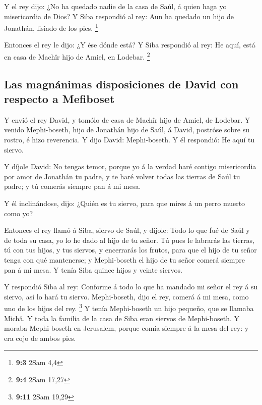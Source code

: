  Y el rey dijo: ¿No ha quedado nadie de la casa de Saúl, á
quien haga yo misericordia de Dios? Y Siba respondió al rey: Aun ha
quedado un hijo de Jonathán, lisiado de los pies. \footnote{\textbf{9:3}
  2Sam 4,4}

 Entonces el rey le dijo: ¿Y ése dónde está? Y Siba
respondió al rey: He aquí, está en casa de Machîr hijo de Amiel, en
Lodebar. \footnote{\textbf{9:4} 2Sam 17,27}

\hypertarget{las-magnuxe1nimas-disposiciones-de-david-con-respecto-a-mefiboset}{%
\subsection{Las magnánimas disposiciones de David con respecto a
Mefiboset}\label{las-magnuxe1nimas-disposiciones-de-david-con-respecto-a-mefiboset}}

 Y envió el rey David, y tomólo de casa de Machîr hijo de
Amiel, de Lodebar.  Y venido Mephi-boseth, hijo de
Jonathán hijo de Saúl, á David, postróse sobre su rostro, é hizo
reverencia. Y dijo David: Mephi-boseth. Y él respondió: He aquí tu
siervo.

 Y díjole David: No tengas temor, porque yo á la verdad
haré contigo misericordia por amor de Jonathán tu padre, y te haré
volver todas las tierras de Saúl tu padre; y tú comerás siempre pan á mi
mesa.

 Y él inclinándose, dijo: ¿Quién es tu siervo, para que
mires á un perro muerto como yo?

 Entonces el rey llamó á Siba, siervo de Saúl, y díjole:
Todo lo que fué de Saúl y de toda su casa, yo lo he dado al hijo de tu
señor.  Tú pues le labrarás las tierras, tú con tus
hijos, y tus siervos, y encerrarás los frutos, para que el hijo de tu
señor tenga con qué mantenerse; y Mephi-boseth el hijo de tu señor
comerá siempre pan á mi mesa. Y tenía Siba quince hijos y veinte
siervos.

 Y respondió Siba al rey: Conforme á todo lo que ha
mandado mi señor el rey á su siervo, así lo hará tu siervo.
Mephi-boseth, dijo el rey, comerá á mi mesa, como uno de los hijos del
rey. \footnote{\textbf{9:11} 2Sam 19,29}  Y tenía
Mephi-boseth un hijo pequeño, que se llamaba Michâ. Y toda la familia de
la casa de Siba eran siervos de Mephi-boseth.  Y moraba
Mephi-boseth en Jerusalem, porque comía siempre á la mesa del rey: y era
cojo de ambos pies.

